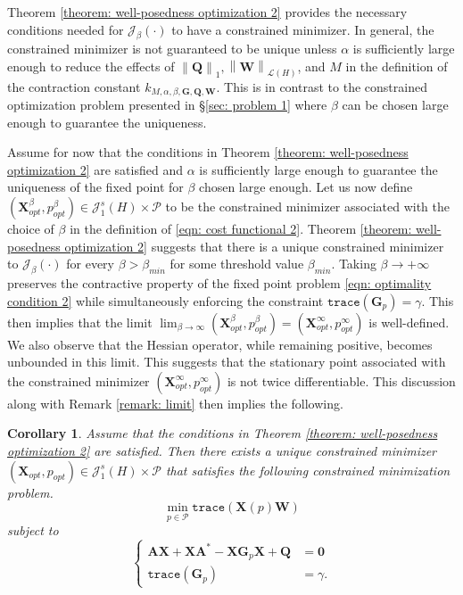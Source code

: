 \documentclass{amsart}
\newcommand{\sL}{\mathscr L}
\newcommand{\sJ}{\mathscr J}
\newcommand{\p}[1]{\left( {#1} \right)}
\newcommand{\norm}[1]{\left\| #1 \right\|}
\newcommand{\trace}[1]{\texttt{trace}\left( #1\right)}
\newcommand{\sP}{\mathcal{P}}
\newcommand{\bA}{\mathbf A}
\newcommand{\bX}{\mathbf X}
\newcommand{\bQ}{\mathbf Q}
\newcommand{\bG}{\mathbf G}
\newcommand{\bW}{\mathbf W}
\newtheorem{corollary}{Corollary}
\begin{document}
Theorem \ref{theorem: well-posedness optimization 2} provides the necessary conditions needed for $\mathcal J_\beta(\cdot)$ to have a constrained minimizer. In general, the constrained minimizer is not guaranteed to be unique unless $\alpha$ is sufficiently large enough to reduce the effects of $\norm{\bQ}_1, \norm{\bW}_{\sL\p{H}}$, and $M$ in the definition of the contraction constant $k_{M, \alpha, \beta, \bG, \bQ, \bW}$. This is in contrast to the constrained optimization problem presented in \S\ref{sec: problem 1} where $\beta$ can be chosen large enough to guarantee the uniqueness. 

Assume for now that the conditions in Theorem \ref{theorem: well-posedness optimization 2} are satisfied and $\alpha$ is sufficiently large enough to guarantee the uniqueness of the fixed point for $\beta$ chosen large enough. Let us now define $(\bX^\beta_{opt}, p^\beta_{opt})\in \sJ_1^s(H) \times \sP$ to be the constrained minimizer associated with the choice of $\beta$ in the definition of \eqref{eqn: cost functional 2}. Theorem \ref{theorem: well-posedness optimization 2} suggests that there is a unique constrained minimizer to $\mathcal J_\beta(\cdot)$ for every $\beta > \beta_{min}$ for some threshold value $\beta_{min}$. Taking $\beta \rightarrow +\infty$ preserves the contractive property of the fixed point problem \eqref{eqn: optimality condition 2} while simultaneously enforcing the constraint $\trace{\bG_p} = \gamma$. This then implies that the limit $\lim_{\beta\rightarrow \infty} \p{\bX^\beta_{opt}, p^\beta_{opt}} = \p{\bX^\infty_{opt}, p^\infty_{opt}}$ is well-defined. We also observe that the Hessian operator, while remaining positive, becomes unbounded in this limit. This suggests that the stationary point associated with the constrained minimizer $\p{\bX^\infty_{opt}, p^\infty_{opt}}$ is not twice differentiable. This discussion along with Remark \ref{remark: limit} then implies the following.

\begin{corollary}
Assume that the conditions in Theorem \ref{theorem: well-posedness optimization 2} are satisfied. Then there exists a unique constrained minimizer $\p{\bX_{opt},p_{opt}} \in \sJ_1^s(H) \times \sP$ that satisfies the following constrained minimization problem. 
\begin{equation*}
    \min_{p \in \sP} \trace{\bX(p)\bW}
\end{equation*}
subject to
\begin{equation*}
\left\{
\begin{aligned}
    \bA\bX + \bX\bA^* - \bX\bG_p\bX + \bQ &= \mathbf 0 \\
    \trace{\bG_p} &= \gamma.
\end{aligned}
\right.
\end{equation*}
\end{corollary}
\end{document}
